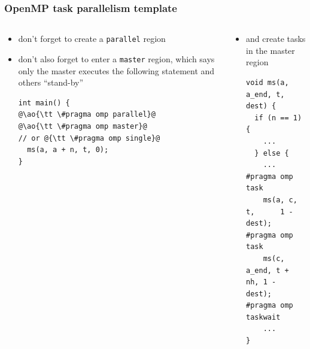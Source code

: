 \documentclass[12pt,dvipdfmx]{beamer}
\newcommand{\ao}[1]{{\color{blue}#1}}
\begin{document}
\begin{frame}[fragile]
\frametitle{OpenMP task parallelism template}
\begin{columns}[t]
\begin{column}{0.48\textwidth}
\begin{itemize}
\item don't forget to create a \ao{\texttt{parallel}} region 
\item don't also forget to enter a \ao{\texttt{master}} region, which says
  only the master executes the following statement
  and others ``stand-by'' 
\begin{lstlisting}
int main() {
@\ao{\tt \#pragma omp parallel}@
@\ao{\tt \#pragma omp master}@
// or @{\tt \#pragma omp single}@
  ms(a, a + n, t, 0);
}
\end{lstlisting}
\end{itemize}
\end{column}

\begin{column}{0.52\textwidth}
\begin{itemize}
\item and create tasks in the master region
\begin{lstlisting}
void ms(a, a_end, t, dest) {
  if (n == 1) {
    ...
  } else {
    ...
#pragma omp task
    ms(a, c,     t,      1 - dest);
#pragma omp task
    ms(c, a_end, t + nh, 1 - dest);
#pragma omp taskwait
    ...
}
\end{lstlisting}
\end{itemize}
\end{column}
\end{columns}
\end{frame}
\end{document}
